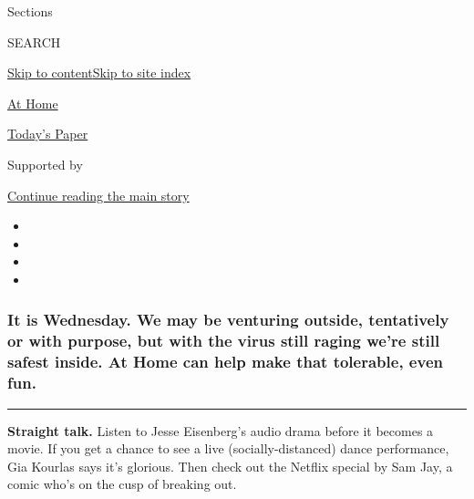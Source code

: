 Sections

SEARCH

\protect\hyperlink{site-content}{Skip to
content}\protect\hyperlink{site-index}{Skip to site index}

\href{https://www.nytimes.com/spotlight/at-home}{At Home}

\href{https://myaccount.nytimes.com/auth/login?response_type=cookie\&client_id=vi}{}

\href{https://www.nytimes.com/section/todayspaper}{Today's Paper}

Supported by

\protect\hyperlink{after-sponsor}{Continue reading the main story}

\begin{itemize}
\item
\item
\item
\item
\end{itemize}

\hypertarget{it-is-wednesday-we-may-be-venturing-outside-tentatively-or-with-purpose-but-with-the-virus-still-raging-were-still-safest-inside-at-home-can-help-make-that-tolerable-even-fun}{%
\subsubsection{\texorpdfstring{\textbf{It is Wednesday.} We may be
venturing outside, tentatively or with purpose, but with the virus still
raging we're still safest inside. \textbf{At Home} can help make that
tolerable, even
fun.}{It is Wednesday. We may be venturing outside, tentatively or with purpose, but with the virus still raging we're still safest inside. At Home can help make that tolerable, even fun.}}\label{it-is-wednesday-we-may-be-venturing-outside-tentatively-or-with-purpose-but-with-the-virus-still-raging-were-still-safest-inside-at-home-can-help-make-that-tolerable-even-fun}}

\begin{center}\rule{0.5\linewidth}{\linethickness}\end{center}

\textbf{Straight talk.} Listen to Jesse Eisenberg's audio drama before
it becomes a movie. If you get a chance to see a live
(socially-distanced) dance performance, Gia Kourlas says it's glorious.
Then check out the Netflix special by Sam Jay, a comic who's on the cusp
of breaking out.

\href{https://www.nytimes.com/2020/08/02/books/jesse-eisenberg-when-you-finish-saving-the-world-audio.html?action=click\&module=RelatedLinks\&pgtype=collection}{}


